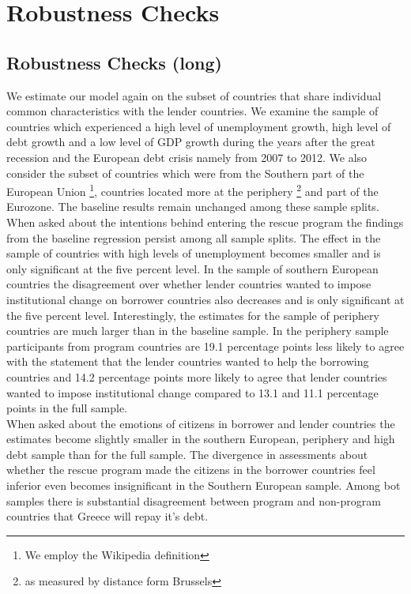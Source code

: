 \section{Robustness Checks}
\subsection{Robustness Checks (long) }
We estimate our model again on the subset of countries that share individual common characteristics with the lender countries. We examine the sample of countries which experienced a high level of unemployment growth, high level of debt growth and a low level of GDP growth during the years after the great recession and the European debt crisis namely from 2007 to 2012. We also consider the subset of countries which  were from the Southern part of the European Union \footnote{We employ the Wikipedia definition}, countries located more at the periphery \footnote{as measured by distance form Brussels} and part of the Eurozone. The baseline results remain unchanged among these sample splits.   When asked about the intentions behind entering the rescue program the findings from the baseline regression persist among all sample splits. The effect in the sample of countries with high levels of unemployment becomes smaller and is only significant at the five percent level. In the sample of southern European countries the disagreement over whether lender countries wanted to impose institutional change on borrower countries also decreases and is only significant at the five percent level. Interestingly, the estimates for the sample of periphery countries are much larger than in the baseline sample. In the periphery sample participants from program countries are 19.1 percentage points less likely to agree with the statement that the lender countries wanted to help the borrowing countries and 14.2 percentage points more likely to agree that lender countries wanted to impose institutional change compared to 13.1 and 11.1 percentage points in the full sample.\\
When asked about the emotions of citizens in borrower and lender countries the estimates become slightly smaller in the southern European, periphery and high debt sample than for the full sample. The divergence in assessments about whether the rescue program made the citizens in the borrower countries feel inferior even becomes insignificant in the Southern European sample. Among bot samples there is substantial disagreement between program and non-program countries that Greece will repay it's debt. 
